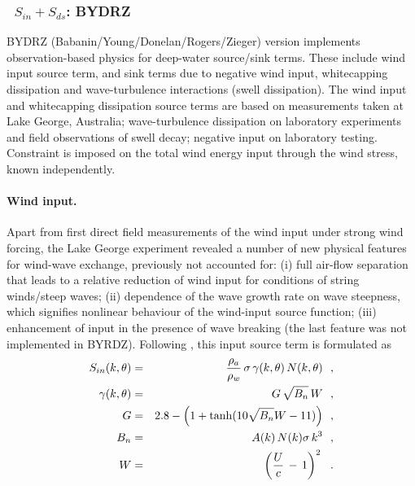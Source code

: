 \vsssub
\subsubsection{~$S_{in} + S_{ds}$: BYDRZ} \label{sec:ST6}
\vsssub


\noindent
BYDRZ (Babanin/Young/Donelan/Rogers/Zieger) version implements\linebreak
observation-based physics for deep-water source/sink terms. These include wind input
source term, and sink terms due to negative wind input, whitecapping
dissipation and wave-turbulence interactions (swell dissipation).
The wind input and whitecapping dissipation source terms are based on
measurements taken at Lake George, Australia; wave-turbulence dissipation
on laboratory experiments and field observations of swell decay; negative
input on laboratory testing. Constraint is imposed on the total wind
energy input through the wind stress, known independently.

\paragraph{Wind input.} Apart from first direct field measurements
of the wind input under strong wind forcing,  the Lake George experiment
revealed a number of new physical features for wind-wave exchange,
previously not accounted for:
(i) full air-flow separation that leads to a relative reduction of
wind input for conditions of string winds/steep waves;
(ii) dependence of the wave growth rate on wave steepness,
which signifies nonlinear behaviour of the wind-input source function;
(iii) enhancement of input in the presence of wave breaking
\citep{art:Dea06,art:Bea07} (the last feature was not implemented in BYRDZ).
Following \citet{art:RBW12}, this input source term is formulated as
\begin{eqnarray}
S_{in}(k,\theta) & = & \frac{\rho_a}{\rho_w}\, \sigma\,\gamma(k,\theta)\,N(k,\theta) \:\:\: ,
\label{eq:ST601} \\ \gamma(k,\theta) &=& G\,\sqrt{B_n}\,W \:\:\: ,
\label{eq:ST602} \\
G                &=& 2.8-\Bigl (1+\tanh (10\sqrt{B_n}W-11) \Bigr) \:\:\: ,
\label{eq:ST603} \\
B_n              &=& A(k)\,N(k)\sigma\,k^3 \:\:\: ,
\label{eq:ST604} \\
W                &=& \left (\frac{U}{c}\,-\,1 \right )^2 \:\:\: .
\label{eq:ST605}
\end{eqnarray}

